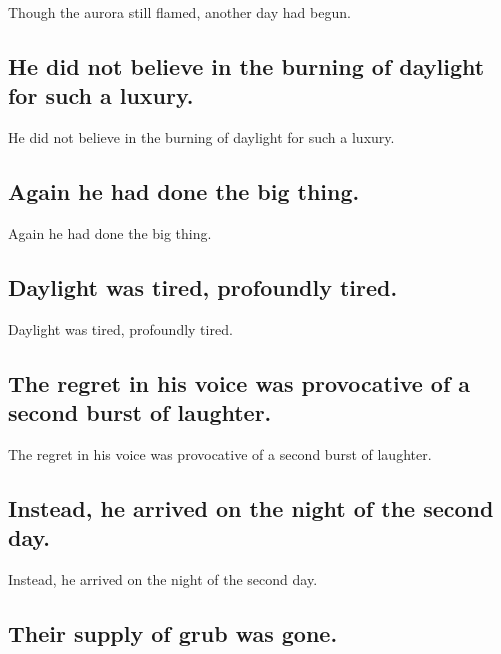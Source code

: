 \documentclass[]{article}
\begin{document}
Though the aurora still flamed, another day had begun.

\hypertarget{he-did-not-believe-in-the-burning-of-daylight-for-such-a-luxury.}{%
\subsection{He did not believe in the burning of daylight for such a
luxury.}\label{he-did-not-believe-in-the-burning-of-daylight-for-such-a-luxury.}}

He did not believe in the burning of daylight for such a luxury.

\hypertarget{again-he-had-done-the-big-thing.}{%
\subsection{Again he had done the big
thing.}\label{again-he-had-done-the-big-thing.}}

Again he had done the big thing.

\hypertarget{daylight-was-tired-profoundly-tired.}{%
\subsection{Daylight was tired, profoundly
tired.}\label{daylight-was-tired-profoundly-tired.}}

Daylight was tired, profoundly tired.

\hypertarget{the-regret-in-his-voice-was-provocative-of-a-second-burst-of-laughter.}{%
\subsection{The regret in his voice was provocative of a second burst of
laughter.}\label{the-regret-in-his-voice-was-provocative-of-a-second-burst-of-laughter.}}

The regret in his voice was provocative of a second burst of laughter.

\hypertarget{instead-he-arrived-on-the-night-of-the-second-day.}{%
\subsection{Instead, he arrived on the night of the second
day.}\label{instead-he-arrived-on-the-night-of-the-second-day.}}

Instead, he arrived on the night of the second day.

\hypertarget{their-supply-of-grub-was-gone.}{%
\subsection{Their supply of grub was
gone.}\label{their-supply-of-grub-was-gone.}}
\end{document}
